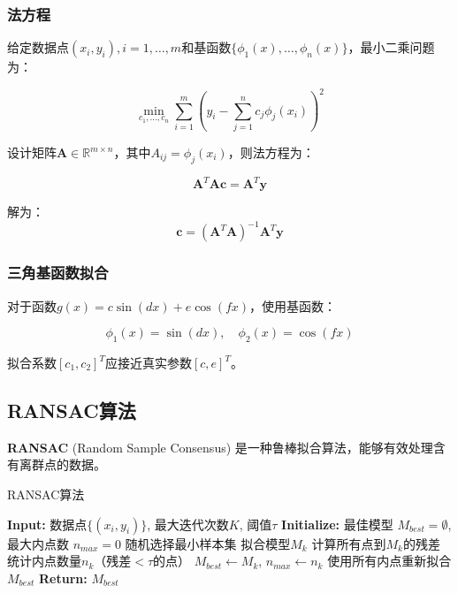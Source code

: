 \documentclass[a4paper,12pt]{article}
\theoremstyle{definition}
\begin{document}
\subsubsection{法方程}

给定数据点$(x_i, y_i), i = 1, \ldots, m$和基函数$\{\phi_1(x), \ldots, \phi_n(x)\}$，最小二乘问题为：

\begin{equation}
\min_{c_1, \ldots, c_n} \sum_{i=1}^{m}\left(y_i - \sum_{j=1}^{n}c_j\phi_j(x_i)\right)^2
\end{equation}

设计矩阵$\mathbf{A} \in \mathbb{R}^{m \times n}$，其中$A_{ij} = \phi_j(x_i)$，则法方程为：

\begin{equation}
\mathbf{A}^T\mathbf{A}\mathbf{c} = \mathbf{A}^T\mathbf{y}
\end{equation}

解为：
\begin{equation}
\mathbf{c} = (\mathbf{A}^T\mathbf{A})^{-1}\mathbf{A}^T\mathbf{y}
\end{equation}

\subsubsection{三角基函数拟合}

对于函数$g(x) = c\sin(dx) + e\cos(fx)$，使用基函数：

\begin{equation}
\phi_1(x) = \sin(dx), \quad \phi_2(x) = \cos(fx)
\end{equation}

拟合系数$[c_1, c_2]^T$应接近真实参数$[c, e]^T$。

\subsection{RANSAC算法}

\textbf{RANSAC} (Random Sample Consensus) 是一种鲁棒拟合算法，能够有效处理含有离群点的数据。

\begin{algorithm}[H]
\caption{RANSAC算法}
\begin{algorithmic}[1]
\STATE \textbf{Input:} 数据点$\{(x_i, y_i)\}$, 最大迭代次数$K$, 阈值$\tau$
\STATE \textbf{Initialize:} 最佳模型 $M_{best} = \emptyset$, 最大内点数 $n_{max} = 0$
    \STATE 随机选择最小样本集
    \STATE 拟合模型$M_k$
    \STATE 计算所有点到$M_k$的残差
    \STATE 统计内点数量$n_k$（残差$< \tau$的点）
        \STATE $M_{best} \leftarrow M_k$, $n_{max} \leftarrow n_k$
    \ENDIF
\ENDFOR
\STATE 使用所有内点重新拟合$M_{best}$
\STATE \textbf{Return:} $M_{best}$
\end{algorithmic}
\end{algorithm}
\end{document}

